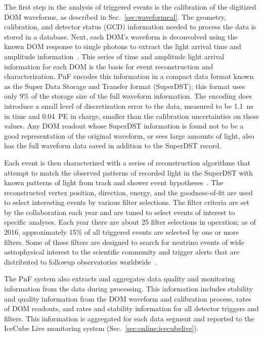The first step in the analysis of triggered events is the calibration of
the digitized DOM waveforms, as described in Sec.~\ref{sec:waveformcal}.
The geometry, calibration, and detector status (GCD) information needed to
process the data is stored in a database.  Next, each DOM's waveform is
deconvolved using the known DOM response to single photons to 
extract the light arrival time and amplitude information~\cite{IC3:ereco}.
This series of time and amplitude light arrival information for each DOM is
the basis for event reconstruction and characterization.  PnF encodes this
information in a compact data format known as the Super Data
Storage and Transfer format (SuperDST); this format uses only 9\% of the storage
size of the full waveform information.  The encoding does introduce a
small level of discretization error to the data, measured to be 1.1~ns in time and
0.04~PE in charge, smaller than the calibration uncertainties on these
values.  Any DOM readout whose SuperDST information is found not to be a
good representation of the original waveform, or sees large amounts of
light, also has the full waveform data saved in addition to the
SuperDST record.


Each event is then characterized with a series of reconstruction
algorithms that attempt to match the observed patterns of recorded light in
the SuperDST with known patterns of light from track and shower event
hypotheses~\cite{IC3:ereco}.  The reconstructed vertex position, direction,
energy, and the goodness-of-fit are used to select interesting events by various
filter selections.  The filter criteria are set by the collaboration
each year and are tuned to select events of interest to specific
analyses.  Each year there are about 25 filter selections in
operation; as of 2016, approximately 15\% of all triggered events are
selected by one or more filters.  Some of these filters are designed to search for
neutrino events of wide astrophysical interest to the scientific community
and trigger alerts that are distributed to followup observatories
worldwide~\cite{Abbasi:2011ja,Aartsen:2015trq}.

The PnF system also extracts and aggregates data quality and monitoring
information from the data during processing.  This information includes
stability and quality information from the DOM waveform and calibration
process, rates of DOM readouts, and rates and 
stability information for all detector triggers and filters.  This
information is aggregated for each data segment and reported to the IceCube
Live monitoring system (Sec.~\ref{sec:online:icecubelive}).

